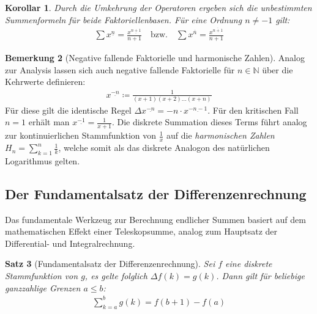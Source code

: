\documentclass{article}
\newtheorem{thm}{Satz}
\newtheorem{cor}[thm]{Korollar}
\theoremstyle{definition}
\newtheorem{bem}[thm]{Bemerkung}
\begin{document}
\begin{cor}
Durch die Umkehrung der Operatoren ergeben sich die unbestimmten Summenformeln für beide Faktoriellenbasen. Für eine Ordnung $n \neq -1$ gilt:
\begin{align*}
    \sum x^{\underline{n}} = \frac{x^{\underline{n+1}}}{n+1} \quad \text{bzw.} \quad \sum x^{\overline{n}} = \frac{x^{\overline{n+1}}}{n+1}
\end{align*}
\end{cor}

\begin{bem}[Negative fallende Faktorielle und harmonische Zahlen]
Analog zur Analysis lassen sich auch negative fallende Faktorielle für $n \in \mathbb{N}$ über die Kehrwerte definieren:
\begin{align*}
    x^{\underline{-n}} \coloneqq \frac{1}{(x+1)(x+2)\dots(x+n)}
\end{align*}
Für diese gilt die identische Regel $\Delta x^{\underline{-n}} = -n \cdot x^{\underline{-n-1}}$. Für den kritischen Fall $n=1$ erhält man $x^{\underline{-1}} = \frac{1}{x+1}$. Die diskrete Summation dieses Terms führt analog zur kontinuierlichen Stammfunktion von $\frac{1}{x}$ auf die \textit{harmonischen Zahlen} $H_n = \sum_{k=1}^n \frac{1}{k}$, welche somit als das diskrete Analogon des natürlichen Logarithmus gelten.
\end{bem}

\subsection{Der Fundamentalsatz der Differenzenrechnung}
Das fundamentale Werkzeug zur Berechnung endlicher Summen basiert auf dem mathematischen Effekt einer Teleskopsumme, analog zum Hauptsatz der Differential- und Integralrechnung.

\begin{thm}[Fundamentalsatz der Differenzenrechnung]
Sei $f$ eine diskrete Stammfunktion von $g$, es gelte folglich $\Delta f(k) = g(k)$. Dann gilt für beliebige ganzzahlige Grenzen $a \le b$:
\begin{align*}
    \sum_{k=a}^b g(k) = f(b+1) - f(a)
\end{align*}
\end{thm}
\end{document}
